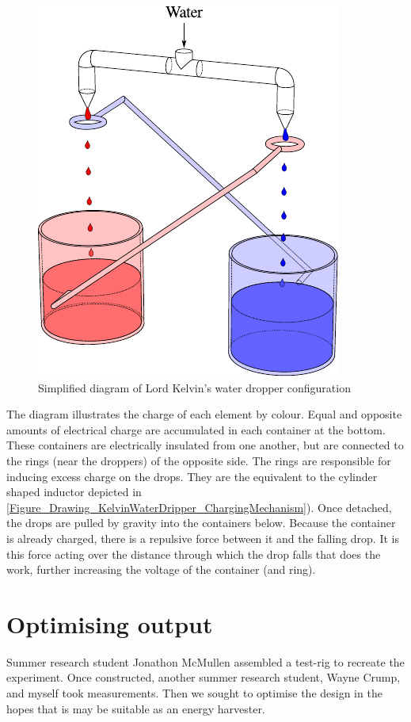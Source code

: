 \begin{figure}
    \centering
    \includegraphics{content/appendices/chargedWaterDrops/graphics/DripperOut}
    \caption{\label{Fig_Diagram_KelvinWaterDripper}Simplified diagram of Lord Kelvin's water dropper configuration}
\end{figure}
The diagram illustrates the charge of each element by colour.
Equal and opposite amounts of electrical charge are accumulated in each container at the bottom.
These containers are electrically insulated from one another, but are connected to the rings (near the droppers) of the opposite side.
The rings are responsible for inducing excess charge on the drops.
They are the equivalent to the cylinder shaped inductor depicted in \cref{Figure_Drawing_KelvinWaterDripper_ChargingMechanism}).
Once detached, the drops are pulled by gravity into the containers below.
Because the container is already charged, there is a repulsive force between it and the falling drop.
It is this force acting over the distance through which the drop falls that does the work, further increasing the voltage of the container (and ring).

\section{Optimising output}

Summer research student Jonathon McMullen assembled a test-rig to recreate the experiment.
Once constructed, another summer research student, Wayne Crump, and myself took measurements.
Then we sought to optimise the design in the hopes that is may be suitable as an energy harvester.


